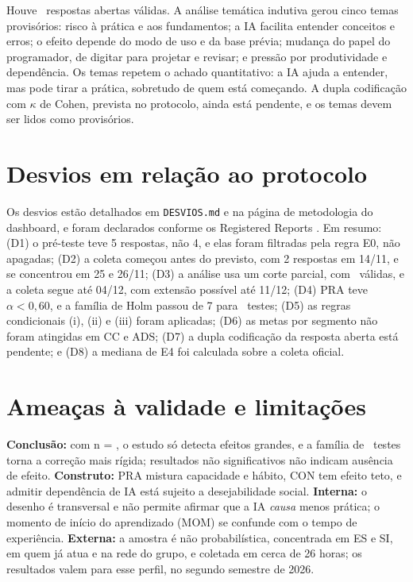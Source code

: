 \documentclass[12pt,a4paper]{article}
\begin{document}
Houve \nABR\ respostas abertas válidas. A análise temática indutiva \citep{braun} gerou cinco temas provisórios: risco à prática e aos fundamentos; a IA facilita entender conceitos e erros; o efeito depende do modo de uso e da base prévia; mudança do papel do programador, de digitar para projetar e revisar; e pressão por produtividade e dependência. Os temas repetem o achado quantitativo: a IA ajuda a entender, mas pode tirar a prática, sobretudo de quem está começando. A dupla codificação com $\kappa$ de Cohen, prevista no protocolo, ainda está pendente, e os temas devem ser lidos como provisórios.

\section{Desvios em relação ao protocolo}\label{sec:desvios}

Os desvios estão detalhados em \texttt{DESVIOS.md} e na página de metodologia do dashboard, e foram declarados conforme os Registered Reports \citep{ralph}. Em resumo: (D1) o pré-teste teve 5 respostas, não 4, e elas foram filtradas pela regra E0, não apagadas; (D2) a coleta começou antes do previsto, com 2 respostas em 14/11, e se concentrou em 25 e 26/11; (D3) a análise usa um corte parcial, com \nValidas\ válidas, e a coleta segue até 04/12, com extensão possível até 11/12; (D4) PRA teve $\alpha < 0{,}60$, e a família de Holm passou de 7 para \nTestes\ testes; (D5) as regras condicionais (i), (ii) e (iii) foram aplicadas; (D6) as metas por segmento não foram atingidas em CC e ADS; (D7) a dupla codificação da resposta aberta está pendente; e (D8) a mediana de E4 foi calculada sobre a coleta oficial.

\section{Ameaças à validade e limitações}

\textbf{Conclusão:} com n = \nUsuarios, o estudo só detecta efeitos grandes, e a família de \nTestes\ testes torna a correção mais rígida; resultados não significativos não indicam ausência de efeito. \textbf{Construto:} PRA mistura capacidade e hábito, CON tem efeito teto, e admitir dependência de IA está sujeito a desejabilidade social. \textbf{Interna:} o desenho é transversal e não permite afirmar que a IA \emph{causa} menos prática; o momento de início do aprendizado (MOM) se confunde com o tempo de experiência. \textbf{Externa:} a amostra é não probabilística, concentrada em ES e SI, em quem já atua e na rede do grupo, e coletada em cerca de 26 horas; os resultados valem para esse perfil, no segundo semestre de 2026.
\end{document}
